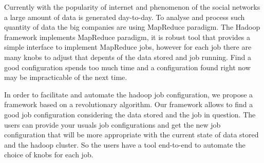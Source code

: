 Currently with the popularity of internet and phenomenon of the social
networks a large amount of data is generated day-to-day. To analyse and
process such quantity of data the big companies are using MapReduce
paradigm. The Hadoop framework implements MapReduce paradigm, it is robust
tool that provides a simple interface to implement MapReduce jobs, however for
each job there are many knobs to adjust that depents of the data stored and job
running. Find a good configuration spends too much time and a configuration found
right now may be impracticable of the next time.

In order to facilitate and automate the hadoop job configuration, we propose
a framework based on a revolutionary algorithm. Our framework allows to find a
good job configuration considering the data stored and the job in question.
The users can provide your usuals job configurations and get the new job
configuration that will be more appropriate with the current state of data
stored and the hadoop cluster. So the users have a tool end-to-end to automate
the choice of knobs for each job.
